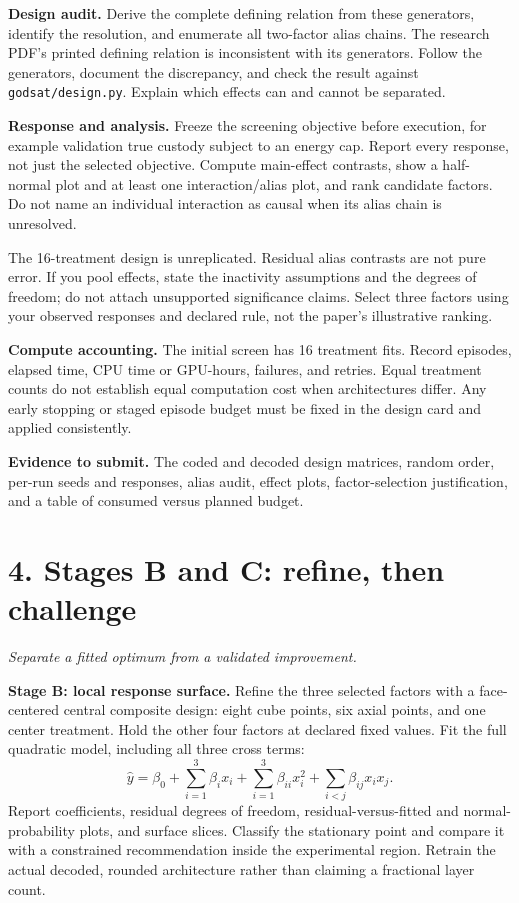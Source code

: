 \documentclass[11pt,letterpaper]{article}
\newcommand{\pageheading}[2]{\section*{\color{navy}#1}\textit{#2}\par}
\newcommand{\code}[1]{\texttt{\small #1}}
\newcommand{\deliver}[1]{\medskip\textbf{Evidence to submit.} #1}
\begin{document}
\textbf{Design audit.} Derive the complete defining relation from these generators, identify the resolution, and enumerate all two-factor alias chains. The research PDF's printed defining relation is inconsistent with its generators. Follow the generators, document the discrepancy, and check the result against \code{godsat/design.py}. Explain which effects can and cannot be separated.

\textbf{Response and analysis.} Freeze the screening objective before execution, for example validation true custody subject to an energy cap. Report every response, not just the selected objective. Compute main-effect contrasts, show a half-normal plot and at least one interaction/alias plot, and rank candidate factors. Do not name an individual interaction as causal when its alias chain is unresolved.

The 16-treatment design is unreplicated. Residual alias contrasts are not pure error. If you pool effects, state the inactivity assumptions and the degrees of freedom; do not attach unsupported significance claims. Select three factors using your observed responses and declared rule, not the paper's illustrative ranking.

\textbf{Compute accounting.} The initial screen has 16 treatment fits. Record episodes, elapsed time, CPU time or GPU-hours, failures, and retries. Equal treatment counts do not establish equal computation cost when architectures differ. Any early stopping or staged episode budget must be fixed in the design card and applied consistently.

\deliver{The coded and decoded design matrices, random order, per-run seeds and responses, alias audit, effect plots, factor-selection justification, and a table of consumed versus planned budget.}

\newpage
\pageheading{4. Stages B and C: refine, then challenge}{Separate a fitted optimum from a validated improvement.}
\textbf{Stage B: local response surface.} Refine the three selected factors with a face-centered central composite design: eight cube points, six axial points, and one center treatment. Hold the other four factors at declared fixed values. Fit the full quadratic model, including all three cross terms:
\[
\hat y=\beta_0+\sum_{i=1}^{3}\beta_i x_i+
\sum_{i=1}^{3}\beta_{ii}x_i^2+
\sum_{i<j}\beta_{ij}x_ix_j.
\]
Report coefficients, residual degrees of freedom, residual-versus-fitted and normal-probability plots, and surface slices. Classify the stationary point and compare it with a constrained recommendation inside the experimental region. Retrain the actual decoded, rounded architecture rather than claiming a fractional layer count.
\end{document}

